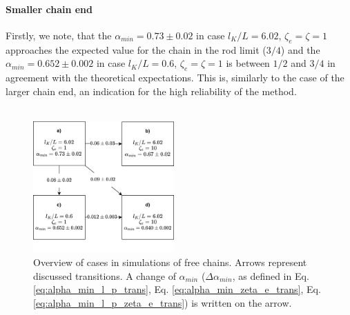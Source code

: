\documentclass[
    paper=A4,pagesize=automedia,fontsize=12pt,
    BCOR=15mm,DIV=22,
    twoside,headinclude,footinclude=false,
    fleqn,             %
    bibliography=totocnumbered,          %
    listof=totoc,                %
    listof=flat,                 %
    cleardoublepage=empty      %
    numbers=endperiod
]{scrartcl}
\begin{document}
\paragraph{Smaller chain end}
Firstly, we note, that the $\alpha_{min} = 0.73 \pm 0.02$
in case $l_K/L=6.02$, $\zeta_e=\zeta=1$ approaches the expected value for 
the chain in the rod limit ($3/4$) and the $\alpha_{min} = 0.652 \pm 0.002$ in case
$l_K/L=0.6$, $\zeta_e=\zeta=1$ is between $1/2$ and $3/4$ in agreement with the 
theoretical expectations. This is, similarly to the case of the larger chain end, 
an indication for the high reliability of the method.
\\
\\
\begin{figure}[H]
    \centering
    \includegraphics[width=0.48\textwidth]{cases_diag.png}
    \caption{
        Overview of cases in simulations of free chains.
        Arrows represent discussed transitions.
        A change of $\alpha_{min}$ 
        ($\Delta \alpha_{min}$, as defined in 
        Eq. \ref{eq:alpha_min_l_p_trans}, Eq. \ref{eq:alpha_min_zeta_e_trans}, 
        Eq. \ref{eq:alpha_min_l_p_zeta_e_trans}) 
        is written on the arrow.
    }
    \label{fig:alpha_cases_diag}
\end{figure}
\end{document}
